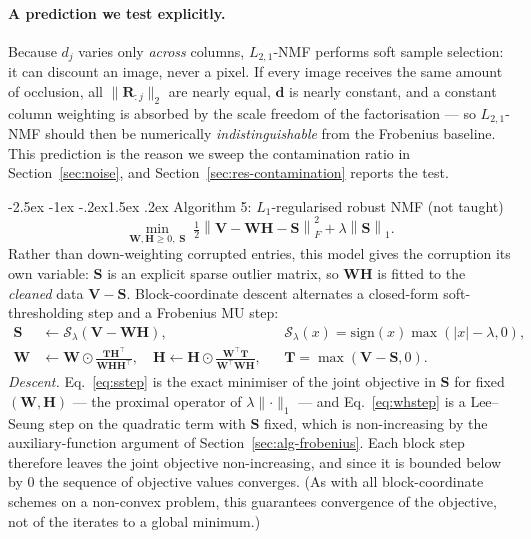 \documentclass[12pt,a4paper]{article}
\makeatletter
\renewcommand\subsection{\@startsection{subsection}{2}{\z@}%
    {-2.5ex \@plus -1ex \@minus -.2ex}{1.5ex \@plus.2ex}%
    {\normalfont\fontsize{12}{14}\bfseries}}
\newcommand{\bV}{\bm{V}}
\newcommand{\bW}{\bm{W}}
\newcommand{\bH}{\bm{H}}
\newcommand{\bS}{\bm{S}}
\newcommand{\bR}{\bm{R}}
\newcommand{\bT}{\bm{T}}
\newcommand{\Frob}[1]{\left\lVert #1 \right\rVert_F}
\newcommand{\Lone}[1]{\left\lVert #1 \right\rVert_1}
\makeatother
\begin{document}
\paragraph{A prediction we test explicitly.} Because $d_j$ varies only
\emph{across} columns, $L_{2,1}$-NMF performs soft sample selection: it can
discount an image, never a pixel. If every image receives the same amount of
occlusion, all $\lVert\bR_{:j}\rVert_2$ are nearly equal, $\bm{d}$ is nearly
constant, and a constant column weighting is absorbed by the scale freedom of
the factorisation --- so $L_{2,1}$-NMF should then be numerically
\emph{indistinguishable} from the Frobenius baseline. This prediction is the
reason we sweep the contamination ratio in Section~\ref{sec:noise}, and
Section~\ref{sec:res-contamination} reports the test.

\subsection{Algorithm 5: $L_1$-regularised robust NMF (not taught)}
\label{sec:l1reg}
\begin{equation}
  \min_{\bW,\bH \ge 0,\; \bS} \;
  \tfrac{1}{2}\Frob{\bV - \bW\bH - \bS}^{2} + \lambda \Lone{\bS} .
\end{equation}
Rather than down-weighting corrupted entries, this model gives the corruption
its own variable: $\bS$ is an explicit sparse outlier matrix, so $\bW\bH$ is
fitted to the \emph{cleaned} data $\bV - \bS$. Block-coordinate descent
alternates a closed-form soft-thresholding step and a Frobenius MU step:
\begin{align}
  \bS &\leftarrow \mathcal{S}_{\lambda}\!\left(\bV - \bW\bH\right),
       &&\mathcal{S}_{\lambda}(x) = \mathrm{sign}(x)\max(|x|-\lambda, 0),
       \label{eq:sstep}\\
  \bW &\leftarrow \bW \odot \frac{\bT\bH^{\top}}{\bW\bH\bH^{\top}},
  \quad
  \bH \leftarrow \bH \odot \frac{\bW^{\top}\bT}{\bW^{\top}\bW\bH},
       &&\bT = \max(\bV - \bS, 0).
       \label{eq:whstep}
\end{align}
\emph{Descent.} Eq.~\eqref{eq:sstep} is the exact minimiser of the joint
objective in $\bS$ for fixed $(\bW,\bH)$ --- the proximal operator of
$\lambda\lVert\cdot\rVert_1$ --- and Eq.~\eqref{eq:whstep} is a Lee--Seung step
on the quadratic term with $\bS$ fixed, which is non-increasing by the
auxiliary-function argument of Section~\ref{sec:alg-frobenius}. Each block
step therefore leaves the joint objective non-increasing, and since it is
bounded below by $0$ the sequence of objective values converges. (As with all
block-coordinate schemes on a non-convex problem, this guarantees convergence
of the objective, not of the iterates to a global minimum.)
\end{document}
